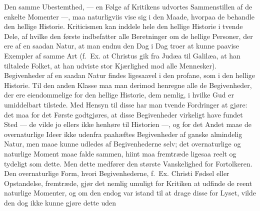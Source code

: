 \documentclass[12pt]{book}
\newcommand{\opage}[1]{\marginnote{\footnotesize\textit{[#1]}}}
\begin{document}
Den samme Ubestemthed, --- en Følge af Kritikens udvortes Sammenstillen af de
enkelte Momenter ---, maa naturligviis vise sig i den Maade, hvorpaa de
behandle den hellige Historie. Kriticismen kan inddele hele den hellige
Historie i tvende Dele, af hvilke den første indbefatter alle Beretninger om
de hellige Personer, der ere af en saadan Natur, at man endnu den Dag i Dag
troer at kunne paavise Exempler af samme Art (f.~Ex. at Christus gik fra
Judæa til Galilæa, at han tiltalede Folket, at han udviste stor Kjærlighed
mod alle Mennesker). Begivenheder af en saadan Natur findes ligesaavel i den
profane, som i den hellige Historie. Til den anden Klasse maa man derimod
henregne alle de Begivenheder,
\opage{117} der ere eiendommelige for den hellige Historie, dem nemlig, i hvilke Gud er
umiddelbart tilstede. Med Hensyn til disse har man tvende Fordringer at gjøre:
det maa for det Første godtgjøres, at disse Begivenheder virkeligt have fundet
Sted --- de vilde jo ellers ikke henhøre til Historien ---, og for det Andet
maae de overnaturlige Ideer ikke udenfra paahæftes Begivenheder af ganske
almindelig Natur, men maae kunne udledes af Begivenhederne selv; det
overnaturlige og naturlige Moment maae falde sammen, hiint maa fremtræde
ligesaa reelt og tydeligt som dette. Men dette medfører den største
Vanskelighed for Fortolkeren. Den overnaturlige Form, hvori Begivenhederne,
f.~Ex. Christi Fødsel eller Opstandelse, fremtræde, gjør det nemlig umuligt
for Kritiken at udfinde de reent naturlige Momenter, og om den endog var
istand til at drage disse for Lyset, vilde den dog ikke kunne gjøre dette uden
\end{document}
